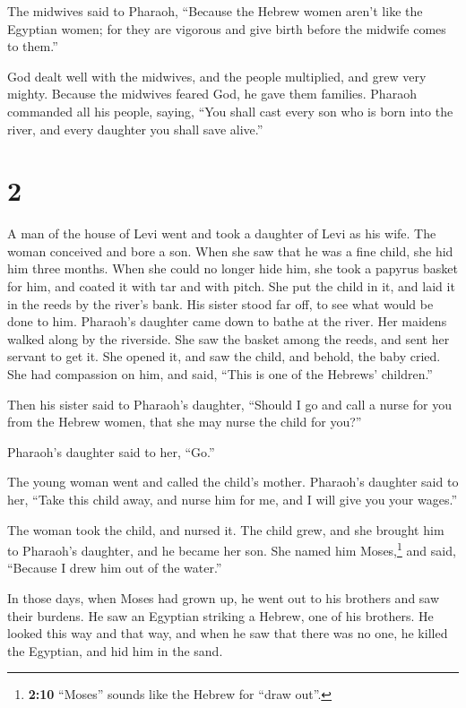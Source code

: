  The midwives said to Pharaoh, ``Because the Hebrew women
aren't like the Egyptian women; for they are vigorous and give birth
before the midwife comes to them.''

 God dealt well with the midwives, and the people
multiplied, and grew very mighty.  Because the midwives
feared God, he gave them families.  Pharaoh commanded all
his people, saying, ``You shall cast every son who is born into the
river, and every daughter you shall save alive.''

\hypertarget{section-1}{%
\section{2}\label{section-1}}

 A man of the house of Levi went and took a daughter of
Levi as his wife.  The woman conceived and bore a son.
When she saw that he was a fine child, she hid him three months.
 When she could no longer hide him, she took a papyrus
basket for him, and coated it with tar and with pitch. She put the child
in it, and laid it in the reeds by the river's bank.  His
sister stood far off, to see what would be done to him. 
Pharaoh's daughter came down to bathe at the river. Her maidens walked
along by the riverside. She saw the basket among the reeds, and sent her
servant to get it.  She opened it, and saw the child, and
behold, the baby cried. She had compassion on him, and said, ``This is
one of the Hebrews' children.''

 Then his sister said to Pharaoh's daughter, ``Should I go
and call a nurse for you from the Hebrew women, that she may nurse the
child for you?''

 Pharaoh's daughter said to her, ``Go.''

The young woman went and called the child's mother. 
Pharaoh's daughter said to her, ``Take this child away, and nurse him
for me, and I will give you your wages.''

The woman took the child, and nursed it.  The child grew,
and she brought him to Pharaoh's daughter, and he became her son. She
named him Moses,\footnote{\textbf{2:10} ``Moses'' sounds like the Hebrew
  for ``draw out''.} and said, ``Because I drew him out of the water.''

 In those days, when Moses had grown up, he went out to
his brothers and saw their burdens. He saw an Egyptian striking a
Hebrew, one of his brothers.  He looked this way and that
way, and when he saw that there was no one, he killed the Egyptian, and
hid him in the sand.


